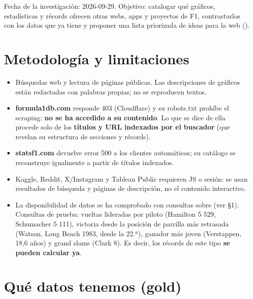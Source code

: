 Fecha de la investigación: 2026-09-29. Objetivo: catalogar qué gráficos, estadísticas y récords ofrecen otras webs, apps y proyectos de F1, contrastarlos con los datos que ya tiene  y proponer una lista priorizada de ideas para la web (\href{https://f1-data-platform.vercel.app/es}{}).

\section{Metodología y limitaciones}

\begin{itemize}
\item Búsquedas web y lectura de páginas públicas. Las descripciones de gráficos están redactadas con palabras propias; no se reproducen textos.
\item \textbf{formula1db.com} responde 403 (Cloudflare) y su robots.txt prohíbe el scraping: \textbf{no se ha accedido a su contenido}. Lo que se dice de ella procede solo de los \textbf{títulos y URL indexados por el buscador} (que revelan su estructura de secciones y récords).
\item \textbf{statsf1.com} devuelve error 500 a los clientes automáticos; su catálogo se reconstruye igualmente a partir de títulos indexados.
\item Kaggle, Reddit, X/Instagram y Tableau Public requieren JS o sesión: se usan resultados de búsqueda y páginas de descripción, no el contenido interactivo.
\item La disponibilidad de datos se ha comprobado con consultas  sobre  (ver §1). Consultas de prueba: vueltas lideradas por piloto (Hamilton 5 529, Schumacher 5 111), victoria desde la posición de parrilla más retrasada (Watson, Long Beach 1983, desde la 22.ª), ganador más joven (Verstappen, 18,6 años) y grand slams (Clark 8). Es decir, los récords de este tipo \textbf{se pueden calcular ya}.
\end{itemize}

\section{Qué datos tenemos (gold)}


